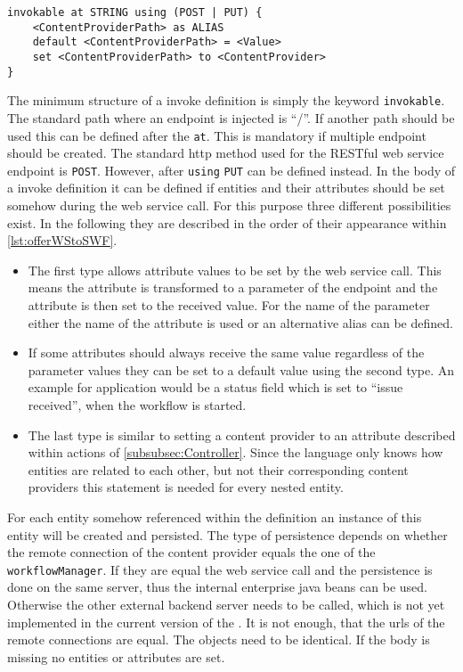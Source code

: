 \begin{lstlisting}[language=MD2, label=lst:offerWStoSWF, caption=Offer a Web Service to Start a Workflow]
invokable at STRING using (POST | PUT) {
	<ContentProviderPath> as ALIAS
	default <ContentProviderPath> = <Value>
	set <ContentProviderPath> to <ContentProvider>
}
\end{lstlisting}
The minimum structure of a invoke definition is simply the keyword \lstinline|invokable|. The standard path where an endpoint is injected is \enquote{/}. If another path should be used this can be defined after the \lstinline|at|. This is mandatory if multiple endpoint should be created.
The standard http method used for the RESTful web service endpoint is \lstinline|POST|. However, after \lstinline|using| \lstinline|PUT| can be defined instead.
In the body of a invoke definition it can be defined if entities and their attributes should be set somehow during the web service call. For this purpose three different possibilities exist. In the following they are described in the order of their appearance within \cref{lst:offerWStoSWF}.
\begin{itemize}
	\item The first type allows attribute values to be set by the web service call. This means the attribute is transformed to a parameter of the endpoint and the attribute is then set to the received value. For the name of the parameter either the name of the attribute is used or an alternative alias can be defined.
	\item If some attributes should always receive the same value regardless of the parameter values they can be set to a default value using the second type. An example for application would be a status field which is set to \enquote{issue received}, when the workflow is started.
	\item The last type is similar to setting a content provider to an attribute described within actions of \cref{subsubsec:Controller}. Since the language only knows how entities are related to each other, but not their corresponding content providers this statement is needed for every nested entity.
\end{itemize}
For each entity somehow referenced within the definition an instance of this entity will be created and persisted. The type of persistence depends on whether the remote connection of the content provider equals the one of the \lstinline|workflowManager|. If they are equal the web service call and the persistence is done on the same server, thus the internal enterprise java beans can be used. Otherwise the other external backend server needs to be called, which is not yet implemented in the current version of the \MD. It is not enough, that the urls of the remote connections are equal. The objects need to be identical.
If the body is missing no entities or attributes are set.